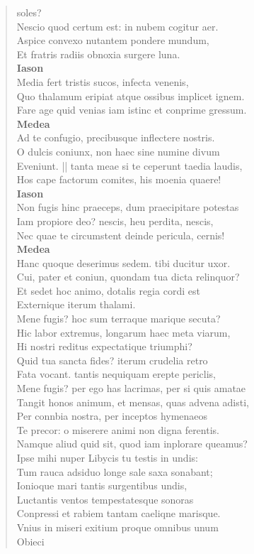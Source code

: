 \documentclass[11pt, a4paper]{report}
\begin{document}
\begin{verse}
{soles? \\ Nescio quod certum est: in nubem cogitur aer. \\ Aspice convexo nutantem pondere mundum, \\ Et fratris radiis obnoxia surgere luna. \\ \textbf{Iason} \\Media fert tristis sucos, infecta venenis, \\ Quo thalamum eripiat atque ossibus implicet ignem. \\ Fare age quid venias iam istinc et conprime gressum. \\ \textbf{Medea} \\Ad te confugio, precibusque inflectere nostris. \\ O dulcis coniunx, non haec sine numine divum \\ Eveniunt. || tanta meae si te ceperunt taedia laudis, \\ Hos cape factorum comites, his moenia quaere! \\ \textbf{Iason} \\Non fugis hinc praeceps, dum praecipitare potestas \\ Iam propiore deo? nescis, heu perdita, nescis, \\ Nec quae te circumstent deinde pericula, cernis! \\ \textbf{Medea} \\Hanc quoque deserimus sedem. tibi ducitur uxor. \\ Cui, pater et coniun, quondam tua dicta relinquor? \\ Et sedet hoc animo, dotalis regia cordi est \\ Externique iterum thalami. \\ Mene fugis? hoc sum terraque marique secuta? \\ Hic labor extremus, longarum haec meta viarum, \\ Hi nostri reditus expectatique triumphi? \\ Quid tua sancta fides? iterum crudelia retro \\ Fata vocant. tantis nequiquam erepte periclis, \\ Mene fugis? per ego has lacrimas, per si quis amatae \\ Tangit honos animum, et mensas, quas advena adisti, \\ Per connbia nostra, per inceptos hymenaeos \\ Te precor:  \lbrack o \rbrack  miserere animi non digna ferentis. \\ Namque aliud quid sit, quod iam inplorare queamus? \\ Ipse mihi nuper Libycis tu testis in undis: \\ Tum rauca adsiduo longe sale saxa sonabant; \\ Ionioque mari tantis surgentibus undis, \\ Luctantis ventos tempestatesque sonoras \\ Conpressi et rabiem tantam caeliqne marisque. \\ Vnius in miseri exitium proque omnibus unum \\ Obieci }
\end{verse}
\end{document}
